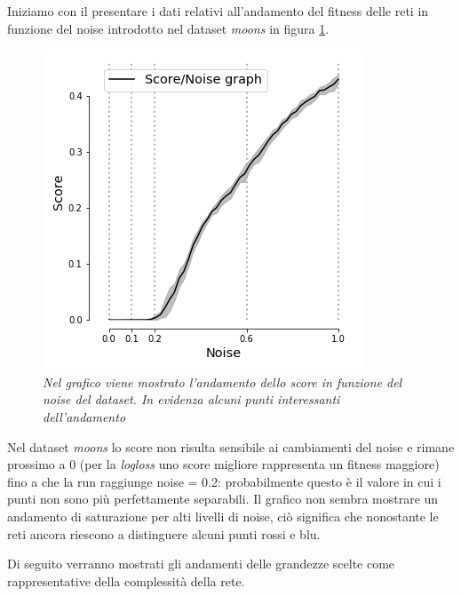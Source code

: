 \documentclass[12pt,a4paper]{report}
\begin{document}
Iniziamo con il presentare i dati relativi all'andamento del fitness delle reti in funzione del noise introdotto nel dataset \textit{moons} in figura \ref{score_moons}.

\begin{figure}[H]
 \centering
 \includegraphics[scale = 0.7]{images/score_noise_moons.png}
 \caption{\textit{Nel grafico viene mostrato l'andamento dello score in funzione del noise del dataset. In evidenza alcuni punti interessanti dell'andamento}}
 \label{score_moons}
\end{figure}

Nel dataset \textit{moons} lo score non risulta sensibile ai cambiamenti del noise e rimane prossimo a 0 (per la \textit{logloss} uno score migliore rappresenta un fitness maggiore) fino a che la run raggiunge noise = 0.2: probabilmente questo è il valore in cui i punti non sono più perfettamente separabili.
Il grafico non sembra mostrare un andamento di saturazione per alti livelli di noise, ciò significa che nonostante le reti ancora riescono a distinguere alcuni punti rossi e blu.

Di seguito verranno mostrati gli andamenti delle grandezze scelte come rappresentative della complessità della rete.
\end{document}
